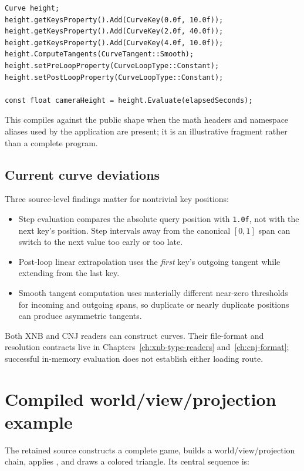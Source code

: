 \begin{lstlisting}
Curve height;
height.getKeysProperty().Add(CurveKey(0.0f, 10.0f));
height.getKeysProperty().Add(CurveKey(2.0f, 40.0f));
height.getKeysProperty().Add(CurveKey(4.0f, 10.0f));
height.ComputeTangents(CurveTangent::Smooth);
height.setPreLoopProperty(CurveLoopType::Constant);
height.setPostLoopProperty(CurveLoopType::Constant);

const float cameraHeight = height.Evaluate(elapsedSeconds);
\end{lstlisting}

This compiles against the public shape when the math headers and namespace aliases used by the
application are present; it is an illustrative fragment rather than a complete program.

\subsection{Current curve deviations}

Three source-level findings matter for nontrivial key positions:

\begin{itemize}
  \item Step evaluation compares the absolute query position with \texttt{1.0f}, not with the
        next key's position. Step intervals away from the canonical $[0,1]$ span can switch to the
        next value too early or too late.
  \item Post-loop linear extrapolation uses the \emph{first} key's outgoing tangent while
        extending from the last key.
  \item Smooth tangent computation uses materially different near-zero thresholds for incoming
        and outgoing spans, so duplicate or nearly duplicate positions can produce asymmetric
        tangents.
\end{itemize}

Both XNB and CNJ readers can construct curves. Their file-format and resolution contracts live in
Chapters~\ref{ch:xnb-type-readers} and~\ref{ch:cnj-format}; successful in-memory evaluation does
not establish either loading route.

\section{Compiled world/view/projection example}
\label{sec:worked-examples}

The retained source  constructs a complete
game, builds a world/view/projection chain, applies , and draws a colored
triangle. Its central sequence is:

